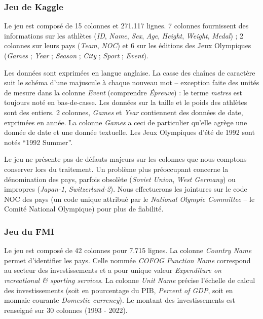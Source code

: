 \documentclass[hidelinks, 12pt]{article}
\begin{document}
%





\subsubsection{Jeu de Kaggle}

Le jeu est composé de 15 colonnes et 271.117 lignes. 7 colonnes fournissent des informations sur les athlètes (\textit{ID}, \textit{Name}, \textit{Sex}, \textit{Age}, \textit{Height}, \textit{Weight}, \textit{Medal}) ; 2 colonnes sur leurs pays (\textit{Team}, \textit{NOC}) et 6 sur les éditions des Jeux Olympiques (\textit{Games} ; \textit{Year} ; \textit{Season} ; \textit{City} ; \textit{Sport} ; \textit{Event}).

Les données sont exprimées en langue anglaise. La casse des chaînes de caractère suit le schéma d'une majuscule à chaque nouveau mot -- exception faite des unités de mesure dans la colonne \textit{Event} (comprendre \textit{Épreuve}) : le terme \textit{metres} est toujours noté en bas-de-casse. Les données sur la taille et le poids des athlètes sont des entiers. 2 colonnes, \textit{Games} et \textit{Year} contiennent des données de date, exprimées en année. La colonne \textit{Games} a ceci de particulier qu'elle agrège une donnée de date et une donnée textuelle. Les Jeux Olympiques d'été de 1992 sont notés \enquote{1992 Summer}.

Le jeu ne présente pas de défauts majeurs sur les colonnes que nous comptons conserver lors du traitement. Un problème plus préoccupant concerne la dénomination des pays, parfois obsolète (\textit{Soviet Union}, \textit{West Germany}) ou impropres (\textit{Japan-1}, \textit{Switzerland-2}). Nous effectuerons les jointures sur le code NOC des pays (un code unique attribué par le \textit{National Olympic Committee} -- le Comité National Olympique) pour plus de fiabilité.





%





\subsubsection{Jeu du FMI}

Le jeu est composé de 42 colonnes pour 7.715 lignes. La colonne \textit{Country Name} permet d'identifier les pays. Celle nommée \textit{COFOG Function Name} correspond au secteur des investissements et a pour unique valeur \textit{Expenditure on recreational \& sporting services}. La colonne \textit{Unit Name} précise l'échelle de calcul des investissements (soit en pourcentage du PIB, \textit{Percent of GDP}, soit en monnaie courante \textit{Domestic currency}). Le montant des investissements est renseigné sur 30 colonnes (1993 - 2022).
\end{document}
